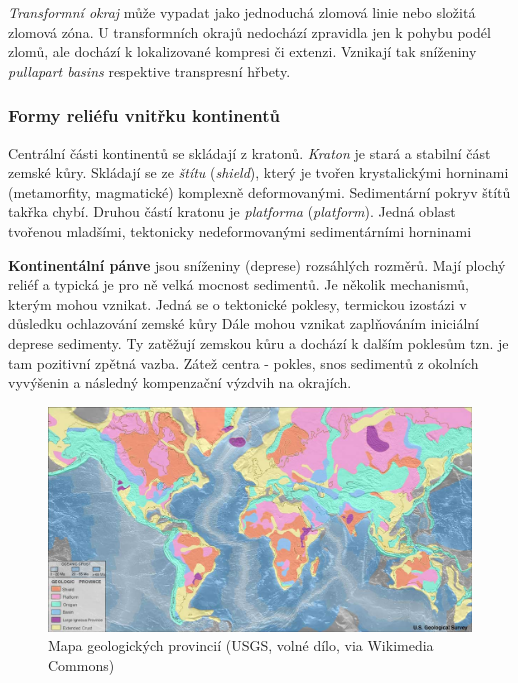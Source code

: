 \emph{Transformní okraj} může vypadat jako jednoduchá zlomová linie nebo složitá zlomová zóna. U transformních okrajů nedochází zpravidla jen k pohybu podél zlomů, ale dochází k lokalizované kompresi či extenzi. Vznikají tak sníženiny \textit{pullapart basins} respektive transpresní hřbety.

\subsubsection{Formy reliéfu vnitřku kontinentů}
Centrální části kontinentů se skládají z kratonů. \emph{Kraton} je stará a stabilní část zemské kůry. Skládají se ze \emph{štítu} (\textit{shield}), který je tvořen krystalickými horninami (metamorfity, magmatické) komplexně deformovanými. Sedimentární pokryv štítů takřka chybí. Druhou částí kratonu je \emph{platforma} (\textit{platform}). Jedná oblast tvořenou mladšími, tektonicky nedeformovanými sedimentárními horninami 

\textbf{Kontinentální pánve} jsou sníženiny (deprese) rozsáhlých rozměrů. Mají plochý reliéf a typická je pro ně velká mocnost sedimentů. Je několik mechanismů, kterým mohou vznikat. Jedná se o tektonické poklesy, termickou izostázi v důsledku ochlazování zemské kůry Dále mohou vznikat zaplňováním iniciální deprese sedimenty. Ty zatěžují zemskou kůru a dochází k dalším poklesům tzn. je tam pozitivní zpětná vazba. Zátež centra - pokles, snos sedimentů z okolních vyvýšenin a následný kompenzační výzdvih na okrajích.

\begin{figure}
	\centering
	\includegraphics[width=1\linewidth]{obrazky/tectonic/World_geologic_provinces}
	\caption{Mapa geologických provincií (USGS, volné dílo, via Wikimedia Commons)}
	\label{fig:worldgeologicprovinces}
\end{figure}
